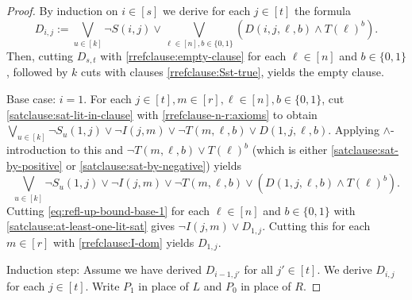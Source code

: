 \documentclass[10pt,a4paper]{article}
\theoremstyle{remark}
\newtheorem*{switching lemma}{Switching Lemma}
\newtheorem*{open problem}{Open Problem}
\theoremstyle{definition}
\begin{document}
\begin{proof}
By induction on $i \in [s]$ we derive for each $j \in [t]$ the formula
\begin{equation}
 D_{i,j} := \bigvee_{u \in [k]}\neg S(i,j) \lor \bigvee_{\ell \in [n], b \in \{0,1\}} \left( D(i,j,\ell,b) \land T(\ell)^b \right).
\end{equation}
Then, cutting $D_{s,t}$ with \eqref{rrefclause:empty-clause} for each $\ell \in [n]$ and $b \in \{0,1\}$, followed by $k$ cuts with clauses \eqref{rrefclause:Sst-true}, yields the empty clause.

Base case: $i=1$. For each $j \in [t], m \in [r], \ell \in [n], b \in \{0,1\}$, cut \eqref{satclause:sat-lit-in-clause} with \eqref{rrefclause-n-r:axioms} to obtain $\bigvee_{u \in [k]} \neg S_u(1,j) \lor \neg I(j,m) \lor \neg T(m,\ell,b) \lor D(1,j,\ell,b)$. Applying $\land$-introduction to this and $\neg T(m,\ell,b) \lor T(\ell)^b$ (which is either
\eqref{satclause:sat-by-positive} or \eqref{satclause:sat-by-negative}) yields 
\begin{equation}
\label{eq:refl-up-bound-base-1}
\bigvee_{u \in [k]} \neg S_u(1,j) \lor \neg I(j,m) \lor \neg T(m,\ell,b) \lor \left(D(1,j,\ell,b) \land T(\ell)^b \right). 
\end{equation}
Cutting \eqref{eq:refl-up-bound-base-1} for each $\ell \in [n]$ and $b \in \{0,1\}$ with \eqref{satclause:at-least-one-lit-sat} gives $\neg I(j,m) \lor D_{1,j}$. Cutting this for each $m \in [r]$ with \eqref{rrefclause:I-dom} yields $D_{1,j}$.

Induction step: Assume we have derived $D_{i-1,j'}$ for all $j' \in [t]$. We derive $D_{i,j}$ for each $j \in [t]$. Write $P_1$ in place of $L$ and  $P_0$ in place of $R$. 


\end{proof}
\end{document}
